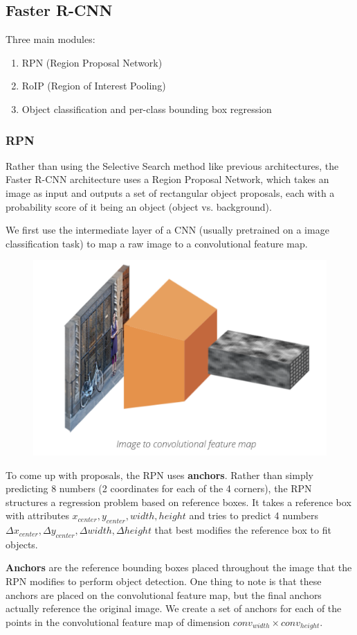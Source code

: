\documentclass[12pt]{article}
\begin{document}
	\subsection*{Faster R-CNN}
	Three main modules:
	\begin{enumerate}
		\item RPN (Region Proposal Network)
		\item RoIP (Region of Interest Pooling)
		\item Object classification and per-class bounding box regression
	\end{enumerate}

	\subsubsection*{RPN}
	Rather than using the Selective Search method like previous architectures, the Faster R-CNN architecture uses a Region Proposal Network, which takes an image as input and outputs a set of rectangular object proposals, each with a probability score of it being an object (object vs. background).
	
	We first use the intermediate layer of a CNN (usually pretrained on a image classification task) to map a raw image to a convolutional feature map.
	\begin{figure}[H]
		\centering
		\includegraphics[width=0.5\linewidth]{figures/image-to-feature}
	\end{figure}
	To come up with proposals, the RPN uses \textbf{anchors}. Rather than simply predicting 8 numbers (2 coordinates for each of the 4 corners), the RPN structures a regression problem based on reference boxes. It takes a reference box with attributes $x_{center}, y_{center}, width, height$ and tries to predict 4 numbers $\Delta x_{center}, \Delta y_{center}, \Delta width, \Delta height$ that best modifies the reference box to fit objects.
	
	\textbf{Anchors} are the reference bounding boxes placed throughout the image that the RPN modifies to perform object detection. One thing to note is that these anchors are placed on the convolutional feature map, but the final anchors actually reference the original image. We create a set of anchors for each of the points in the convolutional feature map of dimension $conv_{width} \times conv_{height}$.
	
\end{document}
